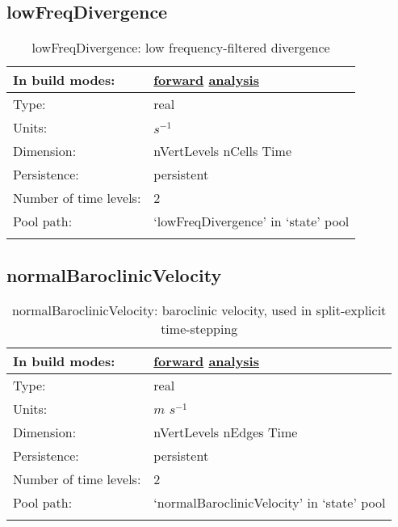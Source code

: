 \subsection[lowFreqDivergence]{lowFreqDivergence}
\label{subsec:var_sec_state_lowFreqDivergence}
\begin{center}
\begin{longtable}{| p{2.0in} | p{4.0in} |}
        \hline 
        In build modes: & \hyperref[subsec:forward_var_tab_state]{forward} \hyperref[subsec:analysis_var_tab_state]{analysis} \\
        \hline 
        Type: & real \\
        \hline 
        Units: & $s^{-1}$ \\
        \hline 
        Dimension: & nVertLevels nCells Time \\
        \hline 
        Persistence: & persistent \\
        \hline 
        Number of time levels: & 2 \\
        \hline 
            Pool path: & `lowFreqDivergence' in `state' pool \\
		 \hline 
    \caption{lowFreqDivergence: low frequency-filtered divergence}
\end{longtable}
\end{center}
\subsection[normalBaroclinicVelocity]{normalBaroclinicVelocity}
\label{subsec:var_sec_state_normalBaroclinicVelocity}
\begin{center}
\begin{longtable}{| p{2.0in} | p{4.0in} |}
        \hline 
        In build modes: & \hyperref[subsec:forward_var_tab_state]{forward} \hyperref[subsec:analysis_var_tab_state]{analysis} \\
        \hline 
        Type: & real \\
        \hline 
        Units: & $m$ $s^{-1}$ \\
        \hline 
        Dimension: & nVertLevels nEdges Time \\
        \hline 
        Persistence: & persistent \\
        \hline 
        Number of time levels: & 2 \\
        \hline 
            Pool path: & `normalBaroclinicVelocity' in `state' pool \\
		 \hline 
    \caption{normalBaroclinicVelocity: baroclinic velocity, used in split-explicit time-stepping}
\end{longtable}
\end{center}
